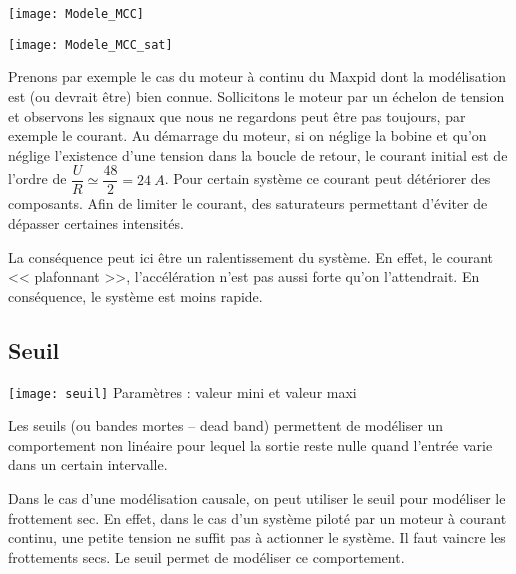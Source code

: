\begin{marginfigure}
\texttt{[image: Modele\_MCC]}

\texttt{[image: Modele\_MCC\_sat]}
\end{marginfigure}
\begin{exemple}

Prenons par exemple le cas du moteur à continu du Maxpid dont la modélisation est (ou devrait être)  bien connue. Sollicitons le moteur par un échelon de tension et observons les signaux que nous ne regardons peut être pas toujours, par exemple le courant. 
Au démarrage du moteur, si on néglige la bobine et qu'on néglige l'existence d'une tension dans la boucle de retour, le courant initial est de l'ordre de $\dfrac{U}{R}\simeq \dfrac{48}{2}=\SI{24}{A}$. Pour certain système ce courant peut détériorer des composants. Afin de limiter le courant, des saturateurs permettant d'éviter de dépasser certaines intensités. 

La conséquence peut ici être un ralentissement du système. En effet, le courant << plafonnant >>, l'accélération n'est pas aussi forte qu'on l'attendrait. En conséquence, le système est moins rapide. 

\end{exemple}

\subsection{Seuil}

\begin{marginfigure}[-2cm]
\centering
\texttt{[image: seuil]}
Paramètres : valeur mini et valeur maxi
\end{marginfigure}

\begin{marginfigure}[1cm]
\centering
{}
\end{marginfigure}


Les seuils (ou bandes mortes -- dead band) permettent de modéliser un comportement non linéaire pour lequel la sortie reste nulle quand l'entrée varie dans un certain intervalle. 

Dans le cas d'une modélisation causale, on peut utiliser le seuil pour modéliser le frottement sec. En effet, dans le cas d'un système piloté par un moteur à courant continu, une petite tension ne suffit pas à actionner le système. Il faut vaincre les frottements secs. Le seuil permet de modéliser ce comportement.


